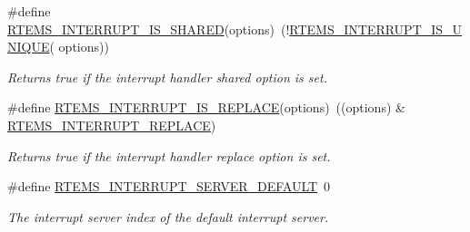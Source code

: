 \begin{DoxyCompactItemize}
\#define \mbox{\hyperlink{group__rtems__interrupt__extension_gaaac773d66ae1853eda87897569730caa}{R\+T\+E\+M\+S\+\_\+\+I\+N\+T\+E\+R\+R\+U\+P\+T\+\_\+\+I\+S\+\_\+\+S\+H\+A\+R\+ED}}(options)~(!\mbox{\hyperlink{group__rtems__interrupt__extension_ga2058eb9a90d813aced09c21a4ce61829}{R\+T\+E\+M\+S\+\_\+\+I\+N\+T\+E\+R\+R\+U\+P\+T\+\_\+\+I\+S\+\_\+\+U\+N\+I\+Q\+UE}}( options))
\begin{DoxyCompactList}\small\item\em Returns true if the interrupt handler shared option is set. \end{DoxyCompactList}\item 
\#define \mbox{\hyperlink{group__rtems__interrupt__extension_ga999cfa3290ebd1618abcb265d772a5c2}{R\+T\+E\+M\+S\+\_\+\+I\+N\+T\+E\+R\+R\+U\+P\+T\+\_\+\+I\+S\+\_\+\+R\+E\+P\+L\+A\+CE}}(options)~((options) \& \mbox{\hyperlink{group__rtems__interrupt__extension_gaca2eb7f8caa5eda72bd6924ee4c8e5d3}{R\+T\+E\+M\+S\+\_\+\+I\+N\+T\+E\+R\+R\+U\+P\+T\+\_\+\+R\+E\+P\+L\+A\+CE}})
\begin{DoxyCompactList}\small\item\em Returns true if the interrupt handler replace option is set. \end{DoxyCompactList}\item 
\#define \mbox{\hyperlink{group__rtems__interrupt__extension_ga756752bdffd9e7115d4395d53248b6c8}{R\+T\+E\+M\+S\+\_\+\+I\+N\+T\+E\+R\+R\+U\+P\+T\+\_\+\+S\+E\+R\+V\+E\+R\+\_\+\+D\+E\+F\+A\+U\+LT}}~0
\begin{DoxyCompactList}\small\item\em The interrupt server index of the default interrupt server. \end{DoxyCompactList}\end{DoxyCompactItemize}
